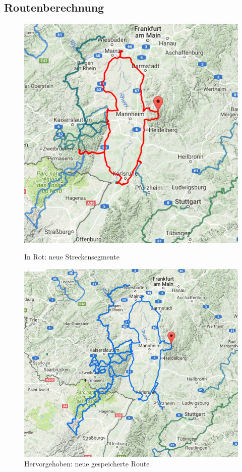 \documentclass[a4paper,11pt,utf8]{scrartcl}
\begin{document}
\subsection{Routenberechnung}
\begin{figure}[htb]
    \centering
    \begin{minipage}[t]{0.45\linewidth}
        \centering
        \includegraphics[width=.75\linewidth]{pics/create.PNG}
        \caption{In Rot: neue Streckensegmente}\label{fig3}
    \end{minipage}%
    \hfill
    \begin{minipage}[t]{0.45\linewidth}
        \centering
        \includegraphics[width=\linewidth]{pics/neu.PNG}
        \caption{Hervorgehoben: neue gespeicherte Route}\label{fig4}
    \end{minipage}
\end{figure}
\end{document}
